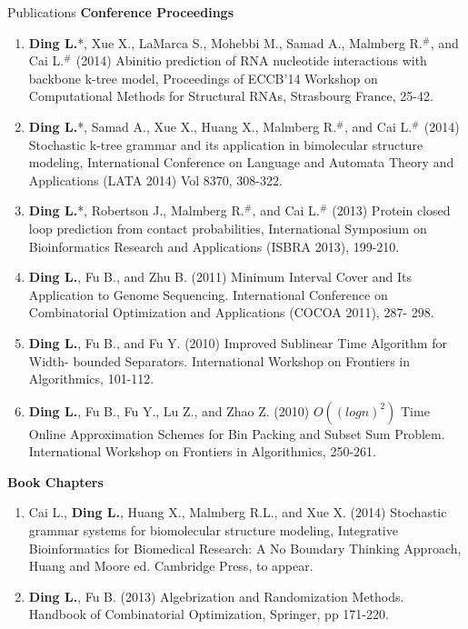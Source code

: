 \documentclass{resume} %
\begin{document}
\begin{rSection}{Publications}
\textbf{Conference Proceedings}
\begin{enumerate}
\item \textbf{Ding L.}*, Xue X., LaMarca S., Mohebbi M., Samad A., Malmberg R.$^{\#}$, and Cai L.$^{\#}$ (2014) Abinitio prediction of RNA nucleotide interactions with backbone k-tree model, Proceedings of ECCB'14 Workshop on Computational Methods for Structural RNAs, Strasbourg France, 25-42.

\item \textbf{Ding L.}*, Samad A., Xue X., Huang X., Malmberg R.$^{\#}$, and Cai L.$^{\#}$ (2014) Stochastic k-tree grammar and its application in bimolecular structure modeling, International Conference on Language and Automata Theory and Applications (LATA 2014) Vol 8370, 308-322.

\item \textbf{Ding L.}*, Robertson J., Malmberg R.$^{\#}$, and Cai L.$^{\#}$ (2013) Protein closed loop prediction from contact probabilities, International Symposium on Bioinformatics Research and Applications (ISBRA 2013), 199-210.

\item \textbf{Ding L.}, Fu B., and Zhu B. (2011) Minimum Interval Cover and Its Application to Genome Sequencing. International Conference on Combinatorial Optimization and Applications (COCOA 2011), 287- 298.

\item \textbf{Ding L.}, Fu B., and Fu Y. (2010) Improved Sublinear Time Algorithm for Width- bounded Separators. International Workshop on Frontiers in Algorithmics, 101-112.

\item \textbf{Ding L.}, Fu B., Fu Y., Lu Z., and Zhao Z. (2010) $O((log n)^2)$ Time Online Approximation Schemes for Bin Packing and Subset Sum Problem. International Workshop on Frontiers in Algorithmics, 250-261.
\end{enumerate}


\textbf{Book Chapters}
\begin{enumerate}
\item Cai L., \textbf{Ding L.}, Huang X., Malmberg R.L., and Xue X. (2014) Stochastic grammar systems for biomolecular structure modeling, Integrative Bioinformatics for Biomedical Research: A No Boundary Thinking Approach, Huang and Moore ed. Cambridge Press, to appear.

\item \textbf{Ding L.}, Fu B. (2013) Algebrization and Randomization Methods. Handbook of Combinatorial Optimization, Springer, pp 171-220.


\end{enumerate}
\end{rSection}
\end{document}
